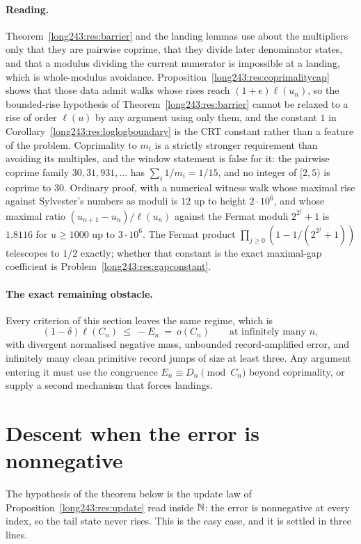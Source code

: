 \documentclass[11pt]{article}
\begin{document}
\paragraph{Reading.}
Theorem~\ref{long243:res:barrier} and the landing lemmas use about the multipliers only
that they are pairwise coprime, that they divide later denominator states, and
that a modulus dividing the current numerator is impossible at a landing, which
is whole-modulus avoidance.  Proposition~\ref{long243:res:coprimalitycap} shows that
those data admit walks whose rises reach $(1+\epsilon)\ell(u_n)$, so the
bounded-rise hypothesis of Theorem~\ref{long243:res:barrier} cannot be relaxed to a
rise of order $\ell(u)$ by any argument using only them, and the constant $1$
in Corollary~\ref{long243:res:loglogboundary} is the CRT constant rather than a feature
of the problem.  Coprimality to $m_i$ is a strictly stronger requirement than
avoiding its multiples, and the window statement is false for it: the pairwise
coprime family $30,31,931,\ldots$ has $\sum_i1/m_i=1/15$, and no integer of
$[2,5)$ is coprime to $30$.  Ordinary proof, with a numerical witness walk
whose maximal rise against Sylvester's numbers as moduli is $12$ up to height
$2\cdot10^6$, and whose maximal ratio $(u_{n+1}-u_n)/\ell(u_n)$ against the
Fermat moduli $2^{2^j}+1$ is $1.8116$ for $u\ge1000$ up to $3\cdot10^6$.  The
Fermat product $\prod_{j\ge0}(1-1/(2^{2^j}+1))$ telescopes to $1/2$ exactly;
whether that constant is the exact maximal-gap coefficient is
Problem~\ref{long243:res:gapconstant}.

\paragraph{The exact remaining obstacle.}
Every criterion of this section leaves the same regime, which is
\[
 (1-\delta)\ell(C_n)\ \le\ -E_n\ =\ o(C_n)
 \qquad\text{at infinitely many }n,
\]
with divergent normalised negative mass, unbounded record-amplified error, and
infinitely many clean primitive record jumps of size at least three.  Any
argument entering it must use the congruence $E_n\equiv D_n\pmod{C_n}$ beyond
coprimality, or supply a second mechanism that forces landings.

\section{Descent when the error is nonnegative}\label{long243:sec:descent}

The hypothesis of the theorem below is the update law of
Proposition~\ref{long243:res:update} read inside $\mathbb{N}$: the error is nonnegative at
every index, so the tail state never rises.  This is the easy case, and it is
settled in three lines.
\end{document}
